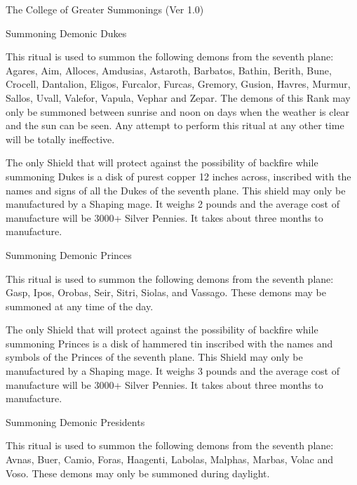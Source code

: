 \begin{Chapter}{The College of Greater Summonings (Ver 1.0)}
\begin{ritual}[R-1]{Summoning Demonic Dukes}

\begin{effects}
This ritual is used to summon the following demons from the seventh
plane: Agares, Aim, Alloces, Amdusias, Astaroth, Barbatos, Bathin,
Berith, Bune, Crocell, Dantalion, Eligos, Furcalor, Furcas, Gremory,
Gusion, Havres, Murmur, Sallos, Uvall, Valefor, Vapula, Vephar and
Zepar.  The demons of this Rank may only be summoned between sunrise
and noon on days when the weather is clear and the sun can be seen.
Any attempt to perform this ritual at any other time will be totally
ineffective.

The only Shield that will protect against the possibility of backfire
while summoning Dukes is a disk of purest copper 12 inches across,
inscribed with the names and signs of all the Dukes of the seventh
plane.  This shield may only be manufactured by a Shaping mage.  It
weighs 2 pounds and the average cost of manufacture will be 3000+
Silver Pennies. It takes about three months to manufacture.
\end{effects}
\end{ritual}

\begin{ritual}[R-2]{Summoning Demonic Princes}

\begin{effects}
This ritual is used to summon the following demons from the seventh
plane: Gasp, Ipos, Orobas, Seir, Sitri, Siolas, and Vassago.  These
demons may be summoned at any time of the day.

The only Shield that will protect against the possibility of backfire
while summoning Princes is a disk of hammered tin inscribed with the
names and symbols of the Princes of the seventh plane.  This Shield
may only be manufactured by a Shaping mage.  It weighs 3 pounds and
the average cost of manufacture will be 3000+ Silver Pennies. It takes
about three months to manufacture.
\end{effects}
\end{ritual}

\begin{ritual}[R-3]{Summoning Demonic Presidents}

\begin{effects}
This ritual is used to summon the following demons from the seventh
plane: Avnas, Buer, Camio, Foras, Haagenti, Labolas, Malphas, Marbas,
Volac and Voso.  These demons may only be summoned during daylight.


\end{effects}
\end{ritual}
\end{Chapter}
